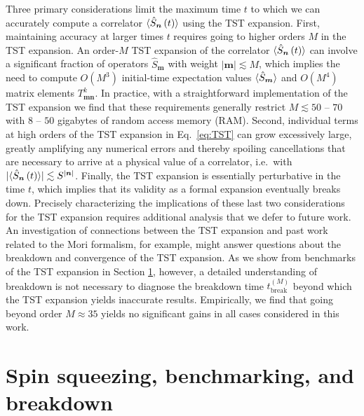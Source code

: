 \documentclass[aps,pra,twocolumn,longbibliography]{revtex4-2}
\renewcommand{\t}{\text} %
\newcommand{\p}[1]{\left( #1 \right)} %
\renewcommand{\v}{\bm} %
\renewcommand{\abs}[1]{\lvert #1 \rvert}
\newcommand{\bk}{\braket} %
\newcommand{\1}{\mathds{1}}
\begin{document}
Three primary considerations limit the maximum time $t$ to which we
can accurately compute a correlator $\bk{\hat S_{\v n}\p{t}}$ using
the TST expansion.  First, maintaining accuracy at larger times $t$
requires going to higher orders $M$ in the TST expansion.  An
order-$M$ TST expansion of the correlator $\bk{\hat S_{\v n}\p{t}}$
can involve a significant fraction of operators $\hat S_{\v m}$ with
weight $\abs{\v m}\lesssim M$, which implies the need to compute
$O\p{M^3}$ initial-time expectation values $\bk{\hat S_{\v m}}$ and
$O\p{M^4}$ matrix elements $T^k_{\v m\v n}$.  In practice, with a
straightforward implementation of the TST expansion we find that these
requirements generally restrict $M\lesssim 50$ -- $70$ with $8$ --
$50$ gigabytes of random access memory (RAM).  Second, individual
terms at high orders of the TST expansion in Eq.~\eqref{eq:TST} can
grow excessively large, greatly amplifying any numerical errors and
thereby spoiling cancellations that are necessary to arrive at a
physical value of a correlator, i.e.~with
$\abs{\bk{\hat S_{\v n}\p{t}}}\lesssim S^{\abs{\v n}}$.  Finally, the
TST expansion is essentially perturbative in the time $t$, which
implies that its validity as a formal expansion eventually breaks
down.  Precisely characterizing the implications of these last two
considerations for the TST expansion requires additional analysis that
we defer to future work.  An investigation of connections between the
TST expansion and past work related to the Mori
formalism\cite{mori1965continuedfraction, annett1994recursive}, for
example, might answer questions about the breakdown and convergence of
the TST expansion.  As we show from benchmarks of the TST expansion in
Section \ref{sec:squeezing}, however, a detailed understanding of
breakdown is not necessary to diagnose the breakdown time
$t_{\t{break}}^{(M)}$ beyond which the TST expansion yields inaccurate
results.  Empirically, we find that going beyond order $M\approx35$
yields no significant gains in all cases considered in this work.

\section{Spin squeezing, benchmarking, and breakdown}
\label{sec:squeezing}
\end{document}
